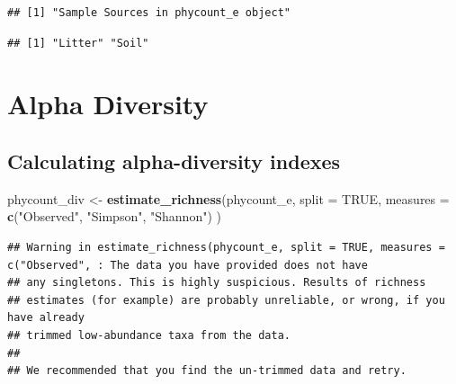 \documentclass[
]{article}
\newenvironment{Shaded}{\begin{snugshade}}{\end{snugshade}}
\newcommand{\AttributeTok}[1]{\textcolor[rgb]{0.13,0.29,0.53}{#1}}
\newcommand{\ConstantTok}[1]{\textcolor[rgb]{0.56,0.35,0.01}{#1}}
\newcommand{\FunctionTok}[1]{\textcolor[rgb]{0.13,0.29,0.53}{\textbf{#1}}}
\newcommand{\NormalTok}[1]{#1}
\newcommand{\OtherTok}[1]{\textcolor[rgb]{0.56,0.35,0.01}{#1}}
\newcommand{\SpecialCharTok}[1]{\textcolor[rgb]{0.81,0.36,0.00}{\textbf{#1}}}
\newcommand{\StringTok}[1]{\textcolor[rgb]{0.31,0.60,0.02}{#1}}
\begin{document}
\begin{verbatim}
## [1] "Sample Sources in phycount_e object"
\end{verbatim}

\begin{Shaded}
\end{Shaded}

\begin{verbatim}
## [1] "Litter" "Soil"
\end{verbatim}

\section{\texorpdfstring{\textbf{Alpha
Diversity}}{Alpha Diversity}}\label{alpha-diversity}

\subsection{Calculating alpha-diversity
indexes}\label{calculating-alpha-diversity-indexes}

\begin{Shaded}
\begin{Highlighting}[]
\NormalTok{phycount\_div }\OtherTok{\textless{}{-}} \FunctionTok{estimate\_richness}\NormalTok{(phycount\_e, }
                                     \AttributeTok{split =} \ConstantTok{TRUE}\NormalTok{, }
                                     \AttributeTok{measures =} \FunctionTok{c}\NormalTok{(}\StringTok{"Observed"}\NormalTok{, }\StringTok{"Simpson"}\NormalTok{, }\StringTok{"Shannon"}\NormalTok{) }
\NormalTok{                                     )}
\end{Highlighting}
\end{Shaded}

\begin{verbatim}
## Warning in estimate_richness(phycount_e, split = TRUE, measures = c("Observed", : The data you have provided does not have
## any singletons. This is highly suspicious. Results of richness
## estimates (for example) are probably unreliable, or wrong, if you have already
## trimmed low-abundance taxa from the data.
## 
## We recommended that you find the un-trimmed data and retry.
\end{verbatim}
\end{document}
